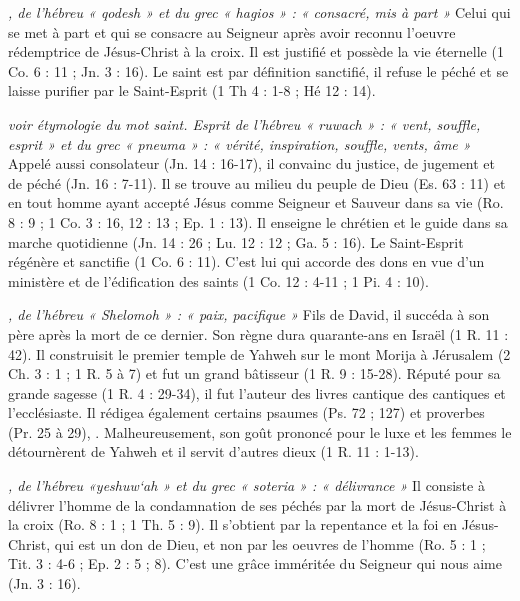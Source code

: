 \begin{multicols}{2}
\textit{, de l'hébreu « qodesh » et du grec « hagios » : « consacré, mis à part »}\newline
Celui qui se met à part et qui se consacre au Seigneur après avoir reconnu l'oeuvre rédemptrice de Jésus-Christ à la croix. Il est justifié et possède la vie éternelle (1 Co. 6 : 11 ; Jn. 3 : 16). Le saint est par définition sanctifié, il refuse le péché et se laisse purifier par le Saint-Esprit (1 Th 4 : 1-8 ; Hé 12 : 14).

\textit{voir étymologie du mot saint. Esprit de l'hébreu « ruwach » : « vent, souffle, esprit » et du grec « pneuma » : « vérité, inspiration, souffle, vents, âme »}\newline
Appelé aussi consolateur (Jn. 14 : 16-17), il convainc du justice, de jugement et de péché (Jn. 16 : 7-11). Il se trouve au milieu du peuple de Dieu (Es. 63 : 11) et en tout homme ayant accepté Jésus comme Seigneur et Sauveur dans sa vie (Ro. 8 : 9 ; 1 Co. 3 : 16, 12 : 13 ; Ep. 1 : 13). Il enseigne le chrétien et le guide dans sa marche quotidienne (Jn. 14 : 26 ; Lu. 12 : 12 ; Ga. 5 : 16). Le Saint-Esprit régénère et sanctifie (1 Co. 6 : 11). C'est lui qui accorde des dons en vue d'un ministère et de l'édification des saints (1 Co. 12 : 4-11 ; 1 Pi. 4 : 10).

\textit{, de l'hébreu « Shelomoh » : « paix, pacifique »}\newline
Fils de David, il succéda à son père après la mort de ce dernier. Son règne dura quarante-ans en Israël (1 R. 11 : 42). Il construisit le premier temple de Yahweh sur le mont Morija à Jérusalem (2 Ch. 3 : 1 ; 1 R. 5 à 7) et fut un grand bâtisseur (1 R. 9 : 15-28). Réputé pour sa grande sagesse (1 R. 4 : 29-34), il fut l'auteur des livres cantique des cantiques et l'ecclésiaste. Il rédigea également certains psaumes (Ps. 72 ; 127) et proverbes (Pr. 25 à 29), . Malheureusement, son goût prononcé pour le luxe et les femmes le détournèrent de Yahweh et il servit d'autres dieux (1 R. 11 : 1-13).

\textit{, de l'hébreu «yeshuw`ah » et du grec « soteria » : « délivrance »}\newline
Il consiste à délivrer l'homme de la condamnation de ses péchés par la mort de Jésus-Christ à la croix (Ro. 8 : 1 ; 1 Th. 5 : 9). Il s'obtient par la repentance et la foi en Jésus-Christ, qui est un don de Dieu, et non par les oeuvres de l'homme (Ro. 5 : 1 ; Tit. 3 : 4-6 ; Ep. 2 : 5 ; 8). C'est une grâce imméritée du Seigneur qui nous aime (Jn. 3 : 16).


\end{multicols}
